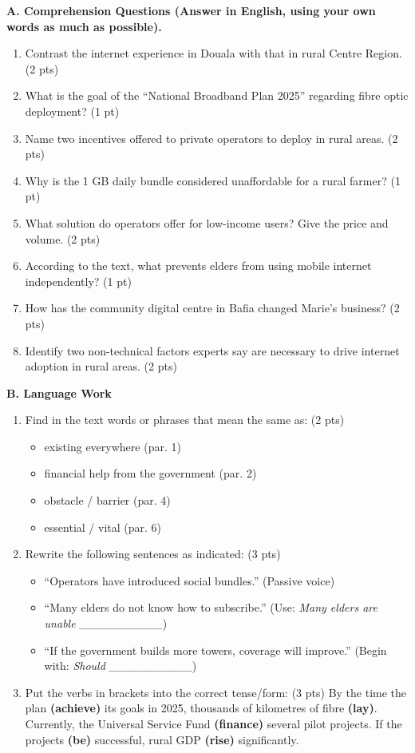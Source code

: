 \documentclass[11pt]{article}
\begin{document}
\begin{exercice}
\textbf{A. Comprehension Questions (Answer in English, using your own words as much as possible).}
\begin{enumerate}
\item Contrast the internet experience in Douala with that in rural Centre Region. (2 pts)
\item What is the goal of the “National Broadband Plan 2025” regarding fibre optic deployment? (1 pt)
\item Name two incentives offered to private operators to deploy in rural areas. (2 pts)
\item Why is the 1 GB daily bundle considered unaffordable for a rural farmer? (1 pt)
\item What solution do operators offer for low-income users? Give the price and volume. (2 pts)
\item According to the text, what prevents elders from using mobile internet independently? (1 pt)
\item How has the community digital centre in Bafia changed Marie's business? (2 pts)
\item Identify two non-technical factors experts say are necessary to drive internet adoption in rural areas. (2 pts)
\end{enumerate}

\textbf{B. Language Work}
\begin{enumerate}
\item Find in the text words or phrases that mean the same as: (2 pts)
      \begin{itemize}
      \item[a)] existing everywhere (par. 1)
      \item[b)] financial help from the government (par. 2)
      \item[c)] obstacle / barrier (par. 4)
      \item[d)] essential / vital (par. 6)
      \end{itemize}
\item Rewrite the following sentences as indicated: (3 pts)
      \begin{itemize}
      \item[a)] ``Operators have introduced social bundles.'' (Passive voice)
      \item[b)] ``Many elders do not know how to subscribe.'' (Use: \emph{Many elders are unable \_\_\_\_\_\_\_\_\_\_})
      \item[c)] ``If the government builds more towers, coverage will improve.'' (Begin with: \emph{Should \_\_\_\_\_\_\_\_\_\_})
      \end{itemize}
\item Put the verbs in brackets into the correct tense/form: (3 pts)
      By the time the plan \textbf{(achieve)} its goals in 2025, thousands of kilometres of fibre \textbf{(lay)}. Currently, the Universal Service Fund \textbf{(finance)} several pilot projects. If the projects \textbf{(be)} successful, rural GDP \textbf{(rise)} significantly.
\end{enumerate}
\end{exercice}
\end{document}
